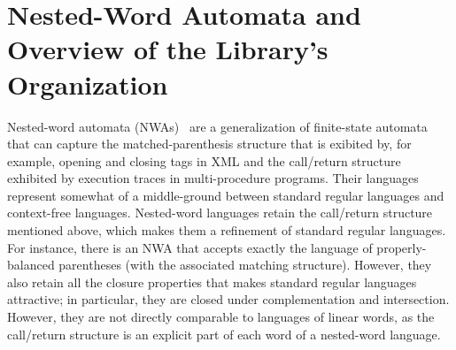 \section{Nested-Word Automata and Overview of the Library's Organization}
\label{Se:Def}

Nested-word automata (NWAs)~\cite{DLT:AM2006,JACM:AM09} are a generalization
of finite-state automata that can capture the matched-parenthesis structure
that is exibited by, for example, opening and closing tags in XML and the
call/return structure exhibited by execution traces in multi-procedure
programs. Their languages represent somewhat of a middle-ground between
standard regular languages and context-free languages. Nested-word languages
retain the call/return structure mentioned above, which makes them a
refinement of standard regular languages. For instance, there is an NWA that
accepts exactly the language of properly-balanced parentheses (with the
associated matching structure). However, they also retain all the closure
properties that makes standard regular languages attractive; in particular,
they are closed under complementation and intersection. However, they are not
directly comparable to languages of linear words, as the call/return
structure is an explicit part of each word of a nested-word language.

